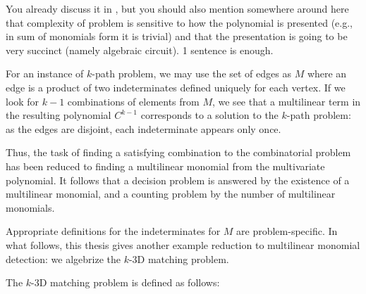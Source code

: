 \begin{anamnote}[nomargin]{}
  You already discuss it in , but you should also
  mention somewhere around here that complexity of problem is sensitive to how
  the polynomial is presented (e.g., in sum of monomials form it is trivial) and
  that the presentation is going to be very succinct (namely algebraic circuit).
  1 sentence is enough.
\end{anamnote}

For an instance of $k$-path problem, we may use the set of edges as $M$ where 
an edge is a product of two indeterminates defined uniquely for each vertex. 
If we look for $k-1$ combinations of elements from $M$, we see that a 
multilinear term in the resulting polynomial $C^{k-1}$ corresponds to a 
solution to the $k$-path problem: as the edges are disjoint, each indeterminate 
appears only once.

Thus, the task of finding a satisfying combination 
to the combinatorial problem has been reduced to 
finding a multilinear monomial from the multivariate polynomial.
It follows that a decision problem is answered by 
the existence of a multilinear monomial, 
and a counting problem by the number of multilinear monomials. 

Appropriate definitions for the indeterminates for $M$ are problem-specific. 
In what follows, this thesis gives another example 
reduction to multilinear monomial detection: we algebrize the $k$-3D matching problem.

The $k$-3D matching problem is defined as follows:
\begin{problem}
\end{problem}

